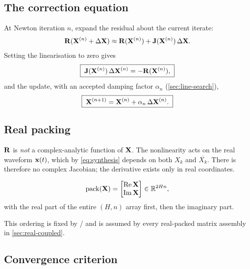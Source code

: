 \subsection{The correction equation}

At Newton iteration $n$, expand the residual about the current iterate:
\begin{equation}
  \mathbf{R}(\mathbf{X}^{(n)} + \Delta\mathbf{X})
  \approx
  \mathbf{R}(\mathbf{X}^{(n)}) + \mathbf{J}(\mathbf{X}^{(n)})\,\Delta\mathbf{X} .
\end{equation}
Setting the linearisation to zero gives
\begin{equation}
  \boxed{\;
  \mathbf{J}(\mathbf{X}^{(n)})\,\Delta\mathbf{X}^{(n)} = -\mathbf{R}(\mathbf{X}^{(n)}),
  \;}
  \label{eq:newton}
\end{equation}
and the update, with an accepted damping factor $\alpha_n$
(\cref{sec:line-search}),
\begin{equation}
  \boxed{\;
  \mathbf{X}^{(n+1)} = \mathbf{X}^{(n)} + \alpha_n\,\Delta\mathbf{X}^{(n)} .
  \;}
  \label{eq:newton-update}
\end{equation}

\subsection{Real packing}

$\mathbf{R}$ is \emph{not} a complex-analytic function of $\mathbf{X}$. The nonlinearity
acts on the real waveform $\mathbf{x}(t)$, which by \eqref{eq:synthesis} depends on
both $X_k$ and $\overline{X_k}$. There is therefore no complex Jacobian; the
derivative exists only in real coordinates.

\begin{convention}
\begin{equation}
  \mathrm{pack}(\mathbf{X}) =
  \begin{bmatrix} \operatorname{Re}\mathbf{X} \\ \operatorname{Im}\mathbf{X} \end{bmatrix}
  \in\mathbb{R}^{2Hn},
\end{equation}
with the real part of the entire $(H,n)$ array first, then the imaginary part.
\end{convention}

This ordering is fixed by  /  and is
assumed by every real-packed matrix assembly in \cref{sec:real-coupled}.

\subsection{Convergence criterion}

